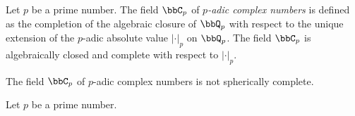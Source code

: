     \begin{construction}\label{constr:p-adic_complex_number}
        Let \(p\) be a prime number.
        The field \(\bbC_p\) of \emph{\(p\)-adic complex numbers} is defined as the completion of the algebraic closure of \(\bbQ_p\) with respect to the unique extension of the \(p\)-adic absolute value \(|\cdot|_p\) on \(\bbQ_p\).
        The field \(\bbC_p\) is algebraically closed and complete with respect to \(|\cdot|_p\).
    \end{construction}

    \begin{proposition}\label{prop:p-adic_complex_number_is_not_spherically_complete}
        The field \(\bbC_p\) of \(p\)-adic complex numbers is not spherically complete.
    \end{proposition}

    \begin{construction}\label{constr:spherically_complete_p-adic_fields}
        Let \(p\) be a prime number.
    \end{construction}

